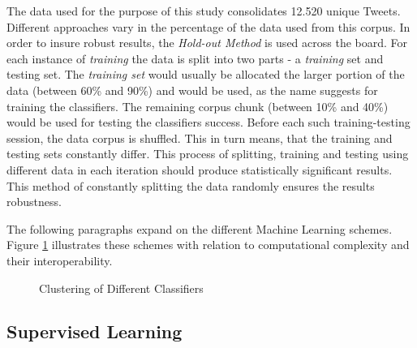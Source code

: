 	\par
	
	The data used for the purpose of this study consolidates 12.520 unique Tweets. Different approaches vary in the percentage of the data used from this corpus. In order to insure robust results, the \textit{Hold-out Method} is used across the board. For each instance of \textit{training} the data is split into two parts - a \textit{training} set and testing set. The \textit{training set} would usually be allocated the larger portion of the data (between 60\% and 90\%) and would be used, as the name suggests for training the classifiers. The remaining corpus chunk (between 10\% and 40\%) would be used for testing the classifiers success. Before each such training-testing session, the data corpus is shuffled. This in turn means, that the training and testing sets constantly differ. This process of splitting, training and testing using different data in each iteration should produce statistically significant results. This method of constantly splitting the data randomly ensures the results robustness.
	
	\par
	
	The following paragraphs expand on the different Machine Learning schemes. Figure \ref{fig:classifier_matrix} illustrates these schemes with relation to computational complexity and their interoperability.
	
	\begin{figure}[h]
		\centering
		\scalebox{1.0}{}
		\captionsetup{width=0.8\textwidth}
		\caption{Clustering of Different Classifiers}
		\label{fig:classifier_matrix}
	\end{figure}
	
	\subsection{Supervised Learning}
	\label{classifer_types}
	
	
	
	
	
	

	
	
	
	
	
	
	
	
	
	
	
	
		
	